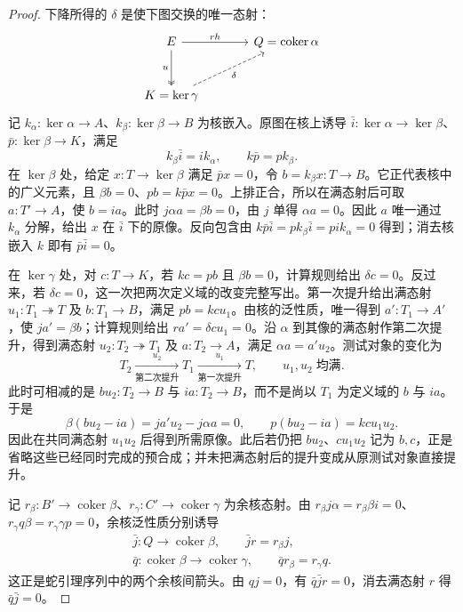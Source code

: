 \begin{proof}
	下降所得的 \(\delta\) 是使下图交换的唯一态射：
	\[
		\begin{tikzcd}[column sep=large,row sep=large]
			E\arrow[r,"rh"]\arrow[d,two heads,"u"']&Q=\operatorname{coker}\alpha\\
			K=\ker\gamma\arrow[ur,dashed,"\delta"']&
		\end{tikzcd}
	\]
	记 \(k_\alpha:\ker\alpha\to A\)、\(k_\beta:\ker\beta\to B\) 为核嵌入。原图在核上诱导 \(\bar i:\ker\alpha\to\ker\beta\)、\(\bar p:\ker\beta\to K\)，满足
	\[
		k_\beta\bar i=ik_\alpha,\qquad k\bar p=pk_\beta.
	\]
	在 \(\ker\beta\) 处，给定 \(x:T\to\ker\beta\) 满足 \(\bar p x=0\)，令 \(b=k_\beta x:T\to B\)。它正代表核中的广义元素，且 \(\beta b=0\)、\(pb=k\bar p x=0\)。上排正合，所以在满态射后可取 \(a:T'\to A\)，使 \(b=i a\)。此时 \(j\alpha a=\beta b=0\)，由 \(j\) 单得 \(\alpha a=0\)。因此 \(a\) 唯一通过 \(k_\alpha\) 分解，给出 \(x\) 在 \(\bar i\) 下的原像。反向包含由 \(k\bar p\bar i=pk_\beta\bar i=pik_\alpha=0\) 得到；消去核嵌入 \(k\) 即有 \(\bar p\bar i=0\)。

	在 \(\ker\gamma\) 处，对 \(c:T\to K\)，若 \(kc=pb\) 且 \(\beta b=0\)，计算规则给出 \(\delta c=0\)。反过来，若 \(\delta c=0\)，这一次把两次定义域的改变完整写出。第一次提升给出满态射 \(u_1:T_1\twoheadrightarrow T\) 及 \(b:T_1\to B\)，满足 \(pb=kcu_1\)。由核的泛性质，唯一得到 \(a':T_1\to A'\)，使 \(ja'=\beta b\)；计算规则给出 \(ra'=\delta cu_1=0\)。沿 \(\alpha\) 到其像的满态射作第二次提升，得到满态射 \(u_2:T_2\twoheadrightarrow T_1\) 及 \(a:T_2\to A\)，满足 \(\alpha a=a'u_2\)。测试对象的变化为
	\[
		T_2\xrightarrow[\text{第二次提升}]{\ u_2\ }T_1 \xrightarrow[\text{第一次提升}]{\ u_1\ }T, \qquad u_1,u_2\;\text{均满}.
	\]
	此时可相减的是 \(bu_2:T_2\to B\) 与 \(ia:T_2\to B\)，而不是尚以 \(T_1\) 为定义域的 \(b\) 与 \(ia\)。于是
	\[
		\beta(bu_2-ia)=ja'u_2-j\alpha a=0,\qquad p(bu_2-ia)=kcu_1u_2.
	\]
	因此在共同满态射 \(u_1u_2\) 后得到所需原像。此后若仍把 \(bu_2\)、\(cu_1u_2\) 记为 \(b,c\)，正是省略这些已经同时完成的预合成；并未把满态射后的提升变成从原测试对象直接提升。

	记 \(r_\beta:B'\to\operatorname{coker}\beta\)、\(r_\gamma:C'\to\operatorname{coker}\gamma\) 为余核态射。由 \(r_\beta j\alpha=r_\beta\beta i=0\)、\(r_\gamma q\beta=r_\gamma\gamma p=0\)，余核泛性质分别诱导
	\[
		\begin{gathered}
			\bar j:Q\longrightarrow\operatorname{coker}\beta, \qquad \bar j r=r_\beta j,\\
			\bar q:\operatorname{coker}\beta\longrightarrow\operatorname{coker}\gamma, \qquad \bar q r_\beta=r_\gamma q.
		\end{gathered}
	\]
	这正是蛇引理序列中的两个余核间箭头。由 \(qj=0\)，有 \(\bar q\bar j r=0\)，消去满态射 \(r\) 得 \(\bar q\bar j=0\)。


\end{proof}
